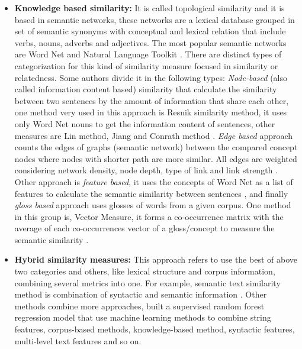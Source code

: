 \documentclass[12pt]{report}
\begin{document}
\begin{itemize}[nolistsep]
	\item \textbf{Knowledge based similarity:} It is called topological similarity and it is based in semantic networks, these networks are a lexical database grouped in set of semantic synonyms with conceptual and lexical relation that include verbs, nouns, adverbs and adjectives. The most popular semantic networks are Word Net and Natural Language Toolkit \cite{gomaa2013} \cite{Pradhan2015} \cite{Majumder2016}. There are distinct types of categorization for this kind of similarity measure focused in similarity or relatedness. Some authors divide it in the following types: \textit{Node-based} (also called information content based) similarity that calculate the similarity between two sentences by the amount of information that share each other, one method very used in this approach is Resnik similarity method, it uses only Word Net nouns to get the information content of sentences, other measures are Lin method, Jiang and Conrath method \cite{Majumder2016} \cite{Zhang2015} \cite{Pradhan2015}. \textit{Edge based} approach counts the edges of graphs (semantic network) between the compared concept nodes where nodes with shorter path are more similar. All edges are weighted considering network density, node depth, type of link and link strength \cite{Majumder2016}  \cite{Zhang2015}. Other approach is \textit{feature based}, it uses the concepts of Word Net as a list of features to calculate the semantic similarity between sentences \cite{Zhang2015}, and finally \textit{gloss based} approach uses glosses of words from a given corpus. One method in this group is, Vector Measure, it forms a co-occurrence matrix with the average of each co-occurrences vector of a gloss/concept to measure the semantic similarity \cite{Pradhan2015}  \cite{Zhang2015}.
	
	\item \textbf{Hybrid similarity measures:} This approach refers to use the best of above two categories and others, like lexical structure and corpus information, combining several metrics into one. For example, semantic text similarity method is combination of syntactic and semantic information \cite{Zhang2015} \cite{Gomaa2013}. Other methods combine more approaches, \cite{Zhu2014} built a supervised random forest regression model that use machine learning methods to combine string features, corpus-based methods, knowledge-based method, syntactic features, multi-level text features and so on.
	
\end{itemize}
\end{document}
